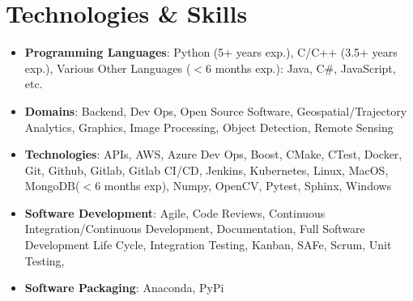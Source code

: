 \documentclass[letterpaper,10pt]{article}
\makeatletter
\newcommand{\resumeAwardItem}[3]{
  \item
    \begin{tabular*}{0.97\textwidth}{l@{\extracolsep{\fill}}r}
      \textbf{#1} \textit{\small #2} & \textit{\small #3} \\
    \end{tabular*}
}
\newcommand{\resumeSubHeadingListStart}{\begin{itemize}[leftmargin=*]}
\newcommand{\resumeSubHeadingListEnd}{\end{itemize}}
\makeatother
\begin{document}
\section{Technologies \& Skills}
 \resumeSubHeadingListStart
   \item{
     \textbf{Programming Languages}{: Python (5+ years exp.), C/C++ (3.5+ years exp.), Various Other Languages ($<$6 months exp.): Java, C\#, JavaScript, etc.  }
   }
   \item{
    \textbf{Domains}{: Backend, Dev Ops,  Open Source Software, Geospatial/Trajectory Analytics, Graphics, Image Processing, Object Detection, Remote Sensing}
   }
   \item{
    \textbf{Technologies}{: APIs, AWS, Azure Dev Ops, Boost, CMake, CTest, Docker, Git, Github, Gitlab, Gitlab CI/CD, Jenkins, Kubernetes, Linux, MacOS, MongoDB($<$6 months exp), Numpy, OpenCV, Pytest, Sphinx, Windows}
   }
   \item{
    \textbf{Software Development}{: Agile, Code Reviews, Continuous Integration/Continuous Development, Documentation, Full Software Development Life Cycle, Integration Testing, Kanban, SAFe, Scrum, Unit Testing},
   }
   \item{
    \textbf{Software Packaging}{: Anaconda, PyPi}
   }
 \resumeSubHeadingListEnd



\end{document}
